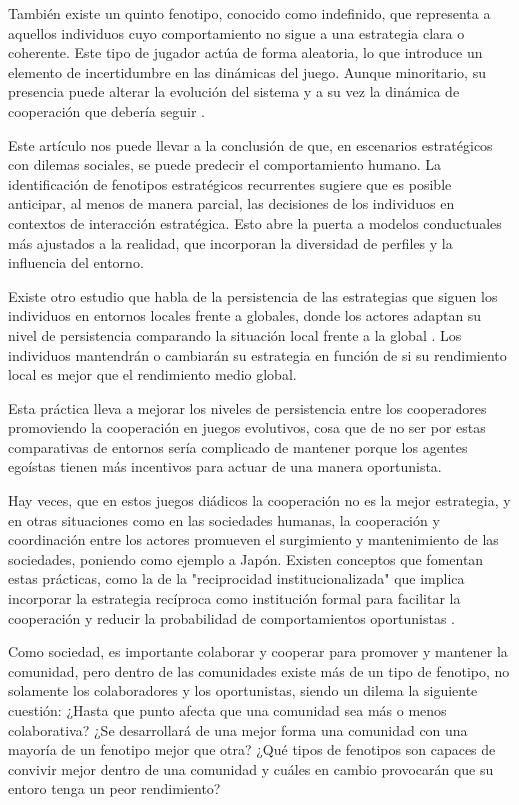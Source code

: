\documentclass[a4paper,12pt]{report}
\begin{document}
También existe un quinto fenotipo, conocido como indefinido, que representa a aquellos individuos cuyo comportamiento no sigue a una estrategia clara o coherente. Este tipo de jugador actúa de forma aleatoria, lo que introduce un elemento de incertidumbre en las dinámicas del juego. Aunque minoritario, su presencia puede alterar la evolución del sistema y a su vez la dinámica de cooperación que debería seguir \cite{paper_principal}.

Este artículo nos puede llevar a la conclusión de que, en escenarios estratégicos con dilemas sociales, se puede predecir el comportamiento humano. La identificación de fenotipos estratégicos recurrentes sugiere que es posible anticipar, al menos de manera parcial, las decisiones de los individuos en contextos de interacción estratégica. Esto abre la puerta a modelos conductuales más ajustados a la realidad, que incorporan la diversidad de perfiles y la influencia del entorno.

Existe otro estudio que habla de la persistencia de las estrategias que siguen los individuos en entornos locales frente a globales, donde los actores adaptan su nivel de persistencia comparando la situación local frente a la global \cite{liming2022adaptative}. Los individuos mantendrán o cambiarán su estrategia en función de si su rendimiento local es mejor que el rendimiento medio global.

Esta práctica lleva a mejorar los niveles de persistencia entre los cooperadores promoviendo la cooperación en juegos evolutivos, cosa que de no ser por estas comparativas de entornos sería complicado de mantener porque los agentes egoístas tienen más incentivos para actuar de una manera oportunista.

Hay veces, que en estos juegos diádicos la cooperación no es la mejor estrategia, y en otras situaciones como en las sociedades humanas, la cooperación y coordinación entre los actores promueven el surgimiento y mantenimiento de las sociedades, poniendo como ejemplo a Japón. Existen conceptos que fomentan estas prácticas, como la de la "reciprocidad institucionalizada" que implica incorporar la estrategia recíproca como institución formal para facilitar la cooperación y reducir la probabilidad de comportamientos oportunistas \cite{Ozono2016Reciprocity}.

Como sociedad, es importante colaborar y cooperar para promover y mantener la comunidad, pero dentro de las comunidades existe más de un tipo de fenotipo, no solamente los colaboradores y los oportunistas, siendo un dilema la siguiente cuestión: ¿Hasta que punto afecta que una comunidad sea más o menos colaborativa? ¿Se desarrollará de una mejor forma una comunidad con una mayoría de un fenotipo mejor que otra? ¿Qué tipos de fenotipos son capaces de convivir mejor dentro de una comunidad y cuáles en cambio provocarán que su entoro tenga un peor rendimiento? 
\end{document}
